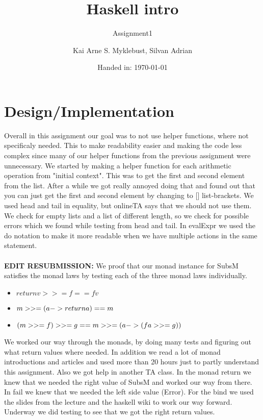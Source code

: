 \documentclass[12pt,a4paper]{article}
\begin{document}
\title{Haskell intro}
\subtitle{Assignment1}

\author{Kai Arne S. Myklebust, Silvan Adrian}
\date{Handed in: \today}
	
\maketitle
\tableofcontents

\section{Design/Implementation}

Overall in this assignment our goal was to not use helper functions, where not specificaly needed. This to make readability easier and making the code less complex since many of our helper functions from the previous assignment were unnecessary.
We started by making a helper function for each arithmetic operation from "initial context". This was to get the first and second element from the list. After a while we got really annoyed doing that and found out that you can just get the first and second element by changing to [] list-brackets.
We used head and tail in equality, but onlineTA says that we should not use them. We check for empty lists and a list of different length, so we check for possible errors which we found while testing from head and tail.
In evalExpr we used the do notation to make it more readable when we have multiple actions in the same statement.\\\\
\textbf{EDIT RESUBMISSION:}
We proof that our monad instance for SubsM satisfies the monad laws by testing each of the three monad laws individually.
\begin{itemize}
	\item $return v >>= f == f v$
	\item $m >>= (\\a -> return a) == m$
	\item $(m >>= f ) >>= g == m >>= (\\a -> (f a >>= g))$
\end{itemize}

We worked our way through the monads, by doing many tests and figuring out what return values where needed. In addition we read a lot of monad introductions and articles and used more than 20 hours just to partly understand this assignment. Also we got help in another TA class.
In the monad return we knew that we needed the right value of SubsM and worked our way from there. In fail we knew that we needed the left side value (Error).
For the bind we used the slides from the lecture and the haskell wiki to work our way forward. Underway we did testing to see that we got the right return values.
\end{document}
